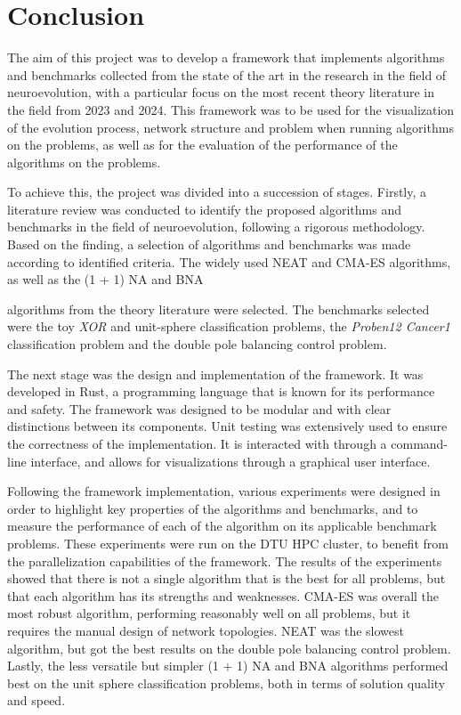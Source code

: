 \chapter{Conclusion}
\label{chap:conclusion}

The aim of this project was to develop a framework that implements algorithms and benchmarks collected from the state of the art in the research in the field of neuroevolution, with a particular
focus on the most recent theory literature in the field from 2023 and 2024. This framework was to be used for the visualization of the evolution process, network structure and problem when
running algorithms on the problems, as well as for the evaluation of the performance of the algorithms on the problems.

To achieve this, the project was divided into a succession of stages. Firstly, a literature review was conducted to identify the proposed algorithms and benchmarks in the field of neuroevolution,
following a rigorous methodology.
Based on the finding, a selection of algorithms and benchmarks was made according to identified criteria. The widely used NEAT and CMA-ES algorithms, as well as the (1 + 1) NA and BNA

algorithms from the theory literature were selected. The benchmarks selected were the toy \textit{XOR} and unit-sphere classification problems, the \textit{Proben12 Cancer1} classification problem
and the double pole balancing control problem.

The next stage was the design and implementation of the framework. It was developed in Rust, a programming language that is known for its performance and safety. The framework was designed
to be modular and with clear distinctions between its components. Unit testing was extensively used to ensure the correctness of the implementation. It is interacted with through a command-line
interface, and allows for visualizations through a graphical user interface.

Following the framework implementation, various experiments were designed in order to highlight key properties of the algorithms and benchmarks, and to measure the performance of each of
the algorithm on its applicable benchmark problems. These experiments were run on the DTU HPC cluster, to benefit from the parallelization capabilities of the framework.
The results of the experiments showed that there is not a single algorithm that is the best for all problems, but that each algorithm has its strengths and weaknesses. CMA-ES was overall
the most robust algorithm, performing reasonably well on all problems, but it requires the manual design of network topologies. NEAT was the slowest algorithm, but got the best results on the
double pole balancing control problem. Lastly, the less versatile but simpler (1 + 1) NA and BNA algorithms performed best on the unit sphere classification problems, both in terms of
solution quality and speed.

